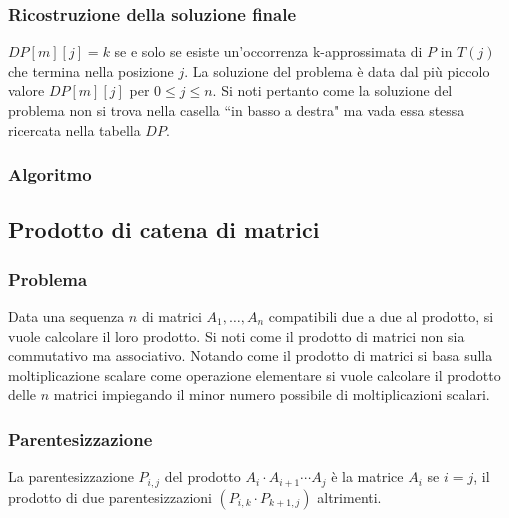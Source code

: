 		\subsubsection{Ricostruzione della soluzione finale}
			$DP[m][j] = k$ se e solo se esiste un'occorrenza k-approssimata di $P$ in $T(j)$ che termina nella posizione $j$. La soluzione del problema \`e data dal pi\`u piccolo valore  $DP[m][j]$ 
			per $0\le j\le n$. Si noti pertanto come la soluzione del problema non si trova nella casella ``in basso a destra" ma vada essa stessa ricercata nella tabella $DP$.
		\subsubsection{Algoritmo}
			
	\subsection{Prodotto di catena di matrici}
		\subsubsection{Problema}
			Data una sequenza $n$ di matrici $A_1, \dots, A_n$ compatibili due a due al prodotto, si vuole calcolare il loro prodotto. Si noti come il prodotto di 
			matrici non sia commutativo ma associativo. Notando come il prodotto di matrici si basa sulla moltiplicazione scalare come operazione elementare si vuole
			calcolare il prodotto delle $n$ matrici impiegando il minor numero possibile di moltiplicazioni scalari. 
		\subsubsection{Parentesizzazione}
			La parentesizzazione $P_{i, j}$ del prodotto $A_i\cdot A_{i+1}\cdots A_j$ \`e la matrice $A_i$ se $i=j$, il prodotto di due parentesizzazioni $(P_{i,k}
			\cdot P_{k+1, j})$ altrimenti. 
